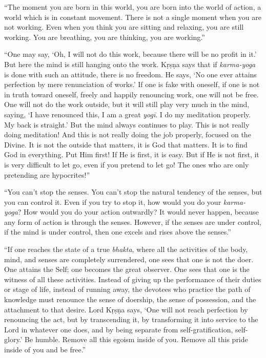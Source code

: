 \enquote{The moment you are born in this world, you are born into the world of action, a world which is in constant movement. There is not a single moment when you are not working. Even when you think you are sitting and relaxing, you are still working. You are breathing, you are thinking, you are working.}

\enquote{One may say, \enquote{Oh, I will not do this work, because there will be no profit in it.} But here the mind is still hanging onto the work. Kṛṣṇa says that if \textit{karma-yoga} is done with such an attitude, there is no freedom. He says, \enquote{No one ever attains perfection by mere renunciation of works.} If one is fake with oneself, if one is not in truth toward oneself, freely and happily renouncing work, one will not be free. One will not do the work outside, but it will still play very much in the mind, saying, \enquote{I have renounced this, I am a great \textit{yogī}. I do my meditation properly. My back is straight.} But the mind always continues to play. This is not really doing meditation! And this is not really doing the job properly, focused on the Divine. It is not the outside that matters, it is God that matters. It is to find God in everything. Put Him first! If He is first, it is easy. But if He is not first, it is very difficult to let go, even if you pretend to let go! The ones who are only pretending are hypocrites!}

\enquote{You can’t stop the senses. You can’t stop the natural tendency of the senses, but you can control it. Even if you try to stop it, how would you do your \textit{karma-yoga}? How would you do your action outwardly? It would never happen, because any form of action is through the senses. However, if the senses are under control, if the mind is under control, then one excels and rises above the senses.}

\enquote{If one reaches the state of a true \textit{bhakta}, where all the activities of the body, mind, and senses are completely surrendered, one sees that one is not the doer. One attains the Self; one becomes the great observer. One sees that one is the witness of all these activities. Instead of giving up the performance of their duties or stage of life, instead of running away, the devotees who practice the path of knowledge must renounce the sense of doership, the sense of possession, and the attachment to that desire. Lord Kṛṣṇa says, \enquote{One will not reach perfection by renouncing the act, but by transcending it, by transforming it into service to the Lord in whatever one does, and by being separate from self-gratification, self-glory.} Be humble. Remove all this egoism inside of you. Remove all this pride inside of you and be free.}

